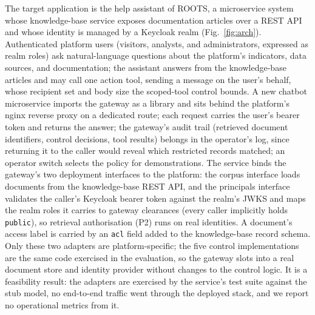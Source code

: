 \documentclass[conference]{IEEEtran}
\begin{document}
The target application is the help assistant of ROOTS, a microservice system whose knowledge-base service exposes documentation
articles over a REST API and whose identity is managed by a Keycloak realm
(Fig.~\ref{fig:arch}). Authenticated platform users (visitors, analysts, and
administrators, expressed as realm roles) ask natural-language questions about the
platform's indicators, data sources, and documentation; the assistant answers from
the knowledge-base articles and may call one action tool, sending a message on the
user's behalf, whose recipient set and body size the scoped-tool control bounds. A
new chatbot microservice imports the gateway as a library and sits behind the
platform's nginx reverse proxy on a dedicated route; each request carries the
user's bearer token and returns the answer; the gateway's audit trail (retrieved
document identifiers, control decisions, tool results) belongs in the operator's log,
since returning it to the caller would reveal which restricted records matched; an
operator switch selects the policy for demonstrations. The service binds
the gateway's two deployment interfaces to the platform: the corpus interface loads
documents from the knowledge-base REST API, and the principals interface validates
the caller's Keycloak bearer token against the realm's JWKS and maps the realm roles
it carries to gateway clearances (every caller implicitly holds \texttt{public}), so
retrieval authorisation (P2) runs on real identities. A document's access label is
carried by an \texttt{acl} field added to the knowledge-base record schema. Only
these two adapters are platform-specific; the five control implementations are the
same code exercised in the evaluation, so the gateway slots into a real document
store and identity provider without changes to the control logic. It is a
feasibility result: the adapters are exercised by the service's test suite against
the stub model, no end-to-end traffic went through the deployed stack, and we report
no operational metrics from it.
\end{document}
